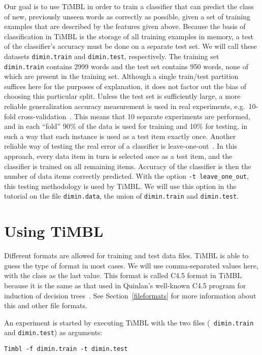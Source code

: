 \documentclass{report}
\begin{document}
Our goal is to use TiMBL in order to train a classifier that can
predict the class of new, previously unseen words as correctly as
possible, given a set of training examples that are described by the
features given above. Because the basis of classification in TiMBL is
the storage of all training examples in memory, a test of the
classifier's accuracy must be done on a separate test set. We will
call these datasets {\tt dimin.train} and {\tt dimin.test},
respectively. The training set {\tt dimin.train} contains 2999 words
and the test set contains 950 words, none of which are present in the
training set. Although a single train/test partition suffices here for
the purposes of explanation, it does not factor out the bias of
choosing this particular split. Unless the test set is sufficiently
large, a more reliable generalization accuracy measurement is used in
real experiments, e.g.~10-fold cross-validation~\cite{Weiss+91}. This
means that 10 separate experiments are performed, and in each ``fold''
90\% of the data is used for training and 10\% for testing, in such a
way that each instance is used as a test item exactly once. Another
reliable way of testing the real error of a classifier is
leave-one-out~\cite{Weiss+91}. In this approach, every data item in
turn is selected once as a test item, and the classifier is trained on
all remaining items. Accuracy of the classifier is then the number of
data items correctly predicted. With the option {\tt -t
leave\_one\_out}, this testing methodology is used by {\sc TiMBL}. We
will use this option in the tutorial on the file {\tt dimin.data}, the
union of {\tt dimin.train} and {\tt dimin.test}.

\section{Using TiMBL}

Different formats are allowed for training and test data files. TiMBL
is able to guess the type of format in most cases. We will use
comma-separated values here, with the class as the last value. This
format is called C4.5 format in TiMBL because it is the same as that
used in Quinlan's well-known C4.5 program for induction of decision
trees~\cite{Quinlan93}. See Section~\ref{fileformats} for more
information about this and other file formats.

An experiment is started by executing TiMBL with the two files ({\tt
dimin.train} and {\tt dimin.test}) as arguments:

{\small
\begin{verbatim}
Timbl -f dimin.train -t dimin.test
\end{verbatim}
}
\end{document}
